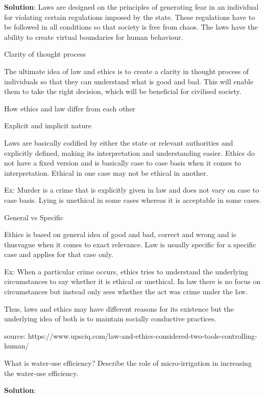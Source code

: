 \documentclass[
]{book}
\newcommand{\question}{\item}
\newenvironment{solution}{ {\bfseries Solution}:}{}
\begin{document}
\begin{questions}
\begin{solution}
Laws are designed on the principles of generating fear in an individual for violating certain regulations imposed by the state. These regulations have to be followed in all conditions so that society is free from chaos. The laws have the ability to create virtual boundaries for human behaviour.

Clarity of thought process

The ultimate idea of law and ethics is to create a clarity in thought process of individuals so that they can understand what is good and bad. This will enable them to take the right decision, which will be beneficial for civilised society.

How ethics and law differ from each other

Explicit and implicit nature

Laws are basically codified by either the state or relevant authorities and explicitly defined, making its interpretation and understanding easier. Ethics do not have a fixed version and is basically case to case basis when it comes to interpretation. Ethical in one case may not be ethical in another.

Ex: Murder is a crime that is explicitly given in law and does not vary on case to case basis.
    Lying is unethical in some cases whereas it is acceptable in some cases.
    
General vs Specific

Ethics is based on general idea of good and bad, correct and wrong and is thusvague when it comes to exact relevance. Law is usually specific for a specific case and applies for that case only.

Ex: When a particular crime occurs, ethics tries to understand the underlying circumstances to say whether it is ethical or unethical. In law there is no focus on circumstances but instead only sees whether the act was crime under the law.

Thus, laws and ethics may have different reasons for its existence but the underlying idea of both is to maintain socially conductive practices.

source: https://www.upsciq.com/law-and-ethics-considered-two-tools-controlling-human/
\end{solution}

\question What is water-use efficiency? Describe the role of micro-irrigation in increasing the water-use efficiency.

\begin{solution}


\end{solution}
\end{questions}
\end{document}
